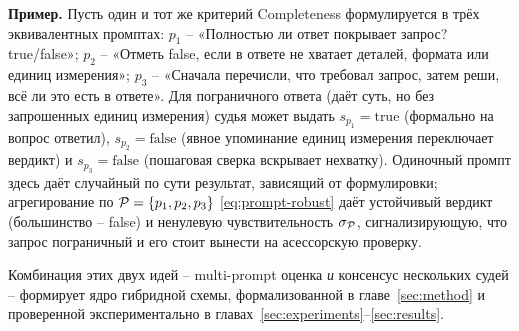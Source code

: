 \textbf{Пример.}
Пусть один и тот же критерий Completeness формулируется в трёх
эквивалентных промптах: $p_1$ -- «Полностью ли ответ покрывает запрос?
true/false»; $p_2$ -- «Отметь false, если в ответе не хватает деталей,
формата или единиц измерения»; $p_3$ -- «Сначала перечисли, что
требовал запрос, затем реши, всё ли это есть в ответе».
Для пограничного ответа (даёт суть, но без запрошенных единиц
измерения) судья может выдать $s_{p_1} = \text{true}$ (формально на
вопрос ответил), $s_{p_2} = \text{false}$ (явное упоминание единиц
измерения переключает вердикт) и $s_{p_3} = \text{false}$ (пошаговая
сверка вскрывает нехватку).
Одиночный промпт здесь даёт случайный по сути результат, зависящий от
формулировки; агрегирование по $\mathcal{P} = \{p_1, p_2, p_3\}$
\eqref{eq:prompt-robust} даёт устойчивый вердикт (большинство --
false) и ненулевую чувствительность $\sigma_{\mathcal{P}}$, сигнализирующую,
что запрос пограничный и его стоит вынести на асессорскую проверку.

Комбинация этих двух идей -- multi-prompt оценка \emph{и} консенсус
нескольких судей -- формирует ядро гибридной схемы, формализованной в
главе~\ref{sec:method} и проверенной экспериментально в
главах~\ref{sec:experiments}--\ref{sec:results}.

